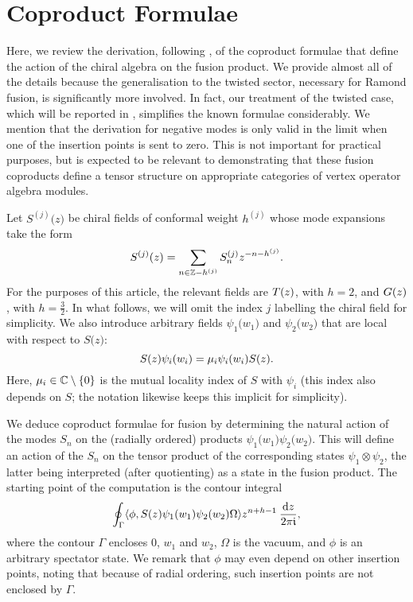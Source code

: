 \documentclass[a4paper,reqno,12pt]{report}
\theoremstyle{definition}
\numberwithin{equation}{section}
\let\originalleft\left     %
\let\originalright\right
\renewcommand{\left}{\mathopen{}\mathclose\bgroup\originalleft}
\renewcommand{\right}{\aftergroup\egroup\originalright}
\newcommand{\func}[2]{#1 \left( #2 \right)} %
\newcommand{\tfunc}[2]{#1 \bigl( #2 \bigr)} %
\newcommand{\set}[1]{\left\{ #1 \right\}}
\newcommand{\ZZ}{\mathbb{Z}}
\newcommand{\CC}{\mathbb{C}}
\newcommand{\dd}{\mathrm{d}}   %
\newcommand{\ii}{\mathfrak{i}} %
\newcommand{\inner}[2]{\left\langle #1 , #2 \right\rangle} %
\theoremstyle{plain}
\begin{document}
\section{Coproduct Formulae} \label{app:Coprod}

Here, we review the derivation, following \cite{GabFus94b}, of the coproduct formulae that define the action of the chiral algebra on the fusion product.  We provide almost all of the details because the generalisation to the twisted sector, necessary for Ramond fusion, is significantly more involved.  In fact, our treatment of the twisted case, which will be reported in \cite{CanFusII15}, simplifies the known formulae \cite{GabFus97} considerably.  We mention that the derivation for negative modes is only valid in the limit when one of the insertion points is sent to zero.  This is not important for practical purposes, but is expected to be relevant to demonstrating that these fusion coproducts define a tensor structure on appropriate categories of vertex operator algebra modules.

Let $\tfunc{S^{(j)}}{z}$ be chiral fields of conformal weight $h^{(j)}$ whose mode expansions take the form
\begin{equation}
\func{S^{(j)}}{z} = \sum_{n \in \ZZ - h^{(j)}} S^{(j)}_n z^{-n-h^{(j)}}.
\end{equation}
For the purposes of this article, the relevant fields are $\func{T}{z}$, with $h=2$, and $\func{G}{z}$, with $h=\frac{3}{2}$.  In what follows, we will omit the index $j$ labelling the chiral field for simplicity.  We also introduce arbitrary fields $\tfunc{\psi_1}{w_1}$ and $\tfunc{\psi_2}{w_2}$ that are local with respect to $\tfunc{S}{z}$:
\begin{equation} \label{eq:UntwistedLocality}
\func{S}{z} \func{\psi_i}{w_i} = \mu_i \func{\psi_i}{w_i} \func{S}{z}.
\end{equation}
Here, $\mu_i \in \CC \setminus \set{0}$ is the mutual locality index of $S$ with $\psi_i$ (this index also depends on $S$; the notation likewise keeps this implicit for simplicity).  

We deduce coproduct formulae for fusion by determining the natural action of the modes $S_n$ on the (radially ordered) products $\tfunc{\psi_1}{w_1} \tfunc{\psi_2}{w_2}$.  This will define an action of the $S_n$ on the tensor product of the corresponding states $\psi_1 \otimes \psi_2$, the latter being interpreted (after quotienting) as a state in the fusion product.  The starting point of the computation is the contour integral
\begin{equation} \label{eq:UntwistedCoprodInt}
\oint_{\Gamma} \inner{\phi}{\func{S}{z} \func{\psi_1}{w_1} \func{\psi_2}{w_2} \Omega} z^{n+h-1} \: \frac{\dd z}{2 \pi \ii},
\end{equation}
where the contour $\Gamma$ encloses $0$, $w_1$ and $w_2$, $\Omega$ is the vacuum, and $\phi$ is an arbitrary spectator state.  We remark that $\phi$ may even depend on other insertion points, noting that because of radial ordering, such insertion points are not enclosed by $\Gamma$.
\end{document}
